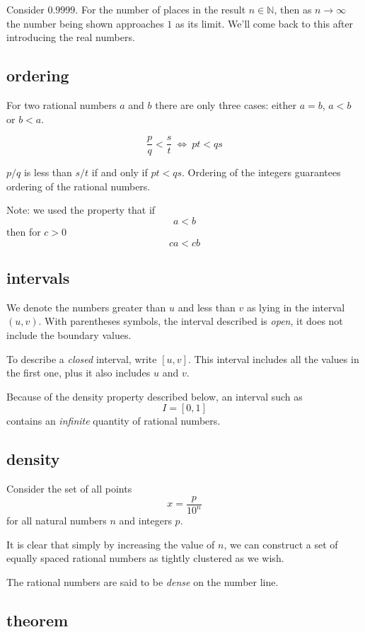 \documentclass[11pt, oneside]{article}
\begin{document}
Consider $0.9999$.  For the number of places in the result $n \in \mathbb{N}$, then as $n \rightarrow \infty$ the number being shown approaches $1$ as its limit.  We'll come back to this after introducing the real numbers.

\subsection*{ordering}
For two rational numbers $a$ and $b$ there are only three cases:  either $a=b$, $a < b$ or $b < a$.

\[ \frac{p}{q} < \frac{s}{t} \ \iff \ pt < qs \]

$p/q$ is less than $s/t$ if and only if $pt < qs$.  Ordering of the integers guarantees ordering of the rational numbers.

Note:  we used the property that if
\[ a < b \]
then for $c > 0$
\[ ca < cb \]

\subsection*{intervals}
We denote the numbers greater than $u$ and less than $v$ as lying in the interval $(u,v)$.  With parentheses symbols, the interval described is \emph{open}, it does not include the boundary values.

To describe a \emph{closed} interval, write $[u,v]$.  This interval includes all the values in the first one, plus it also includes $u$ and $v$.

Because of the density property described below, an interval such as
\[ I = [0,1] \]
contains an \emph{infinite} quantity of rational numbers.

\subsection*{density}
Consider the set of all points
\[ x = \frac{p}{10^n} \]
for all natural numbers $n$ and integers $p$.

It is clear that simply by increasing the value of $n$, we can construct a set of equally spaced rational numbers as tightly clustered as we wish.

The rational numbers are said to be \emph{dense} on the number line.  

\subsection*{theorem}
\end{document}
